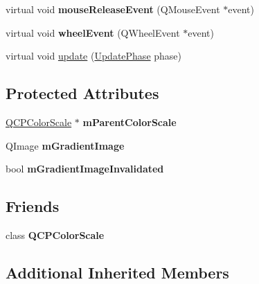 \begin{DoxyCompactItemize}
virtual void {\bfseries mouse\+Release\+Event} (Q\+Mouse\+Event $\ast$event)
\item 
\mbox{\label{class_q_c_p_color_scale_axis_rect_private_a5acf41fc30aa68ea263246ecfad85c31}} 
virtual void {\bfseries wheel\+Event} (Q\+Wheel\+Event $\ast$event)
\item 
virtual void \mbox{\hyperlink{class_q_c_p_color_scale_axis_rect_private_a255080a017df9083a60a321ef2ba9ed8}{update}} (\mbox{\hyperlink{class_q_c_p_layout_element_a0d83360e05735735aaf6d7983c56374d}{Update\+Phase}} phase)
\end{DoxyCompactItemize}
\subsection*{Protected Attributes}
\begin{DoxyCompactItemize}
\item 
\mbox{\label{class_q_c_p_color_scale_axis_rect_private_a311c73f51a4cb0b556388197833cf099}} 
\mbox{\hyperlink{class_q_c_p_color_scale}{Q\+C\+P\+Color\+Scale}} $\ast$ {\bfseries m\+Parent\+Color\+Scale}
\item 
\mbox{\label{class_q_c_p_color_scale_axis_rect_private_ad4f7c8ee1c6012d9950870811773119c}} 
Q\+Image {\bfseries m\+Gradient\+Image}
\item 
\mbox{\label{class_q_c_p_color_scale_axis_rect_private_a2c0b15b071e1f93006b48b5be022a631}} 
bool {\bfseries m\+Gradient\+Image\+Invalidated}
\end{DoxyCompactItemize}
\subsection*{Friends}
\begin{DoxyCompactItemize}
\item 
\mbox{\label{class_q_c_p_color_scale_axis_rect_private_a60f6031408a325ebd1bbbad1ccf9b897}} 
class {\bfseries Q\+C\+P\+Color\+Scale}
\end{DoxyCompactItemize}
\subsection*{Additional Inherited Members}



